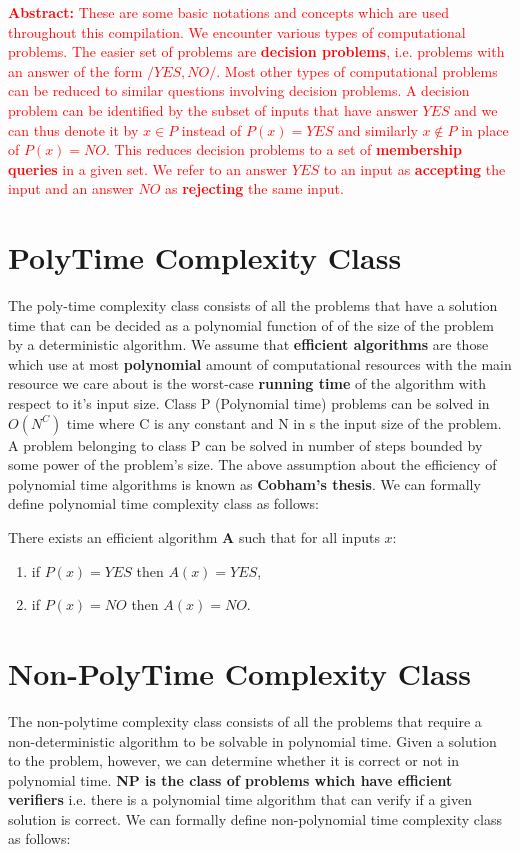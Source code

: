 \textcolor{red}{\textbf{Abstract:} These are some basic notations and concepts which are used throughout this compilation. We encounter various types of computational problems. The easier set of problems are \textbf{decision problems}, i.e. problems with an answer of the form $/{YES, NO/}$. Most other types of computational problems can be reduced to similar questions involving decision problems. A decision problem can be identified by the subset of inputs that have answer $YES$ and we can thus denote it by $x \in P$ instead of $P(x) = YES$ and similarly $x \notin P$ in place of $P(x) = NO$. This reduces decision problems to a set of \textbf{membership queries} in a given set. We refer to an answer $YES$ to an input as \textbf{accepting} the input and an answer $NO$ as \textbf{rejecting} the same input.}

 \section{PolyTime Complexity Class}
 The poly-time complexity class consists of all the problems that have  a solution time that can be decided as  a polynomial function of of the size of the problem by a deterministic algorithm. We assume that \textbf{efficient algorithms} are those which use at most \textbf{polynomial} amount of computational resources with the main resource we care about is the worst-case \textbf{running time} of the algorithm with respect to it's input size. Class P (Polynomial time) problems can be solved in $O(N^C)$ time where C is any constant and N in s the input size of the problem. A problem belonging to class P can be solved in number of steps bounded by some power of the problem's size. The above assumption about the efficiency of polynomial time algorithms is known as \textbf{Cobham's thesis}. We can formally define polynomial time complexity class as follows:
 
 There exists an efficient algorithm $\textbf{A}$ such that for all inputs $x$:
 \begin{enumerate}
     \item if $P(x) = YES$ then $A(x) = YES$,
     \item if $P(x) = NO$ then $A(x) = NO$.
 \end{enumerate}
 
 \section{Non-PolyTime Complexity Class}
 The non-polytime complexity class consists of all the problems that require a non-deterministic algorithm to be solvable in polynomial time. Given a solution to the problem, however, we can determine whether it is correct or not in polynomial time. \textbf{NP is the class of problems which have efficient verifiers} i.e. there is a polynomial time algorithm that can verify if a given solution is correct. We can formally define non-polynomial time complexity class as follows:
 

